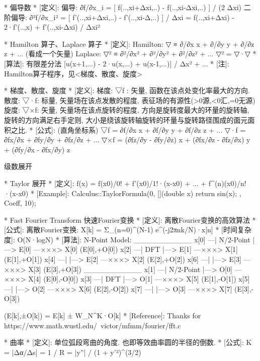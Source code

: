 \documentclass{article}
\begin{document}
*                    偏导数
*	[定义]:
		偏导: ∂f/∂x_i = [ f(..,xi+Δxi,..) -  f(..,xi-Δxi,..) ] / (2 Δxi)
		二阶偏导:
			∂²f/∂x_i² = [ f'(..,xi+Δxi,..) -  f'(..,xi-Δ,..) ] / Δxi
					  = f(..,xi+Δxi) - 2·f'(..,x) + f'(..,xi-Δxi) / Δxi²



*                    Hamilton 算子、Laplace 算子
*	[定义]: 
		Hamilton: ▽  ≡ ∂/∂x \vec x + ∂/∂y \vec y + ∂/∂z \vec z + ... (看成一个矢量)
		Laplace:  ▽² ≡ ∂²/∂x² + ∂²/∂y² + ∂²/∂z² + ...
		▽² = ▽·▽
*	[算法]: 有限差分法
		[u(x+1,...) - 2·u(x,...) + u(x-1,...)] / Δx² + ...
*	[注]: Hamilton算子程序，见<梯度、散度、旋度>                      
       


*                    梯度、散度、旋度
*	[定义]:
		梯度: ▽f		: 矢量, 函数在该点处变化率最大的方向.
		散度: ▽·\vec f: 标量, 矢量场在该点发散的程度, 表征场的有源性(>0源,<0汇,=0无源)
		旋度: ▽×\vec f: 矢量, 矢量场在该点旋转的程度, 
							方向是旋转度最大的环量的旋转轴, 旋转的方向满足右手定则,
							大小是绕该旋转轴旋转的环量与旋转路径围成的面元面积之比.
*	[公式]: (直角坐标系)
		▽f        = ∂f/∂x \vec x + ∂f/∂y \vec y + ∂f/∂z \vec z + ...
		▽·\vec f =  ∂fx/∂x + ∂fy/∂y + ∂fz/∂z + ...
		▽×\vec f = (∂fz/∂y - ∂fy/∂z) \vec x
				   + (∂fx/∂z - ∂fz/∂x) \vec y
				   + (∂fy/∂x - ∂fx/∂y) \vec z


级数展开


*                    Taylor 展开
*	[定义]: 
		f(x) = f(x0)/0! + f'(x0)/1!·(x-x0) + ... + f^(n)(x0)/n!·(x-x0)
*	[Example]:
		Calculus::TaylorFormula(0, [](double x) { return sin(x); }, Coeff, 10);



*					Fast Fourier Transform 快速Fourier变换
*	[定义]: 离散Fourier变换的高效算法
*	[公式]:
		离散Fourier变换: X[k] = Σ_(n=0)^(N-1)  e^(-j2πnk/N)·x[n]
*	[时间复杂度]: O(N·logN)
*	[算法]:
		N-Point Model:
				___________
		x[0] —| N/2-Point |—> E[0] —×××> X[0]  (E[0],+O[0])
		x[2] —|   DFT	   |—> E[1] —×××> X[1]  (E[1],+O[1])
		x[4] —|		   |—> E[2] —×××> X[2]  (E[2],+O[2])
		x[6] —|		   |—> E[3] —×××> X[3]  (E[3],+O[3])
                ___________
		x[1] —| N/2-Point |—> O[0] —×××> X[4]  (E[0],-O[0])
		x[3] —|   DFT	   |—> O[1] —×××> X[5]  (E[1],-O[1])
		x[5] —|		   |—> O[2] —×××> X[6]  (E[2],-O[2])
		x[7] —|		   |—> O[3] —×××> X[7]  (E[3],-O[3])

		(E[k],±O[k]) = E[k] ± W_N^K·O[k]
*	[Reference]:
		Thanks for https://www.math.wustl.edu/~victor/mfmm/fourier/fft.c


*                    曲率
*	[定义]: 单位弧段弯曲的角度. 也即等效曲率圆的半径的倒数.
*	[公式]: K = |Δα/Δs| = 1 / R = |y''| / (1 + y'²)^(3/2)
\end{document}
